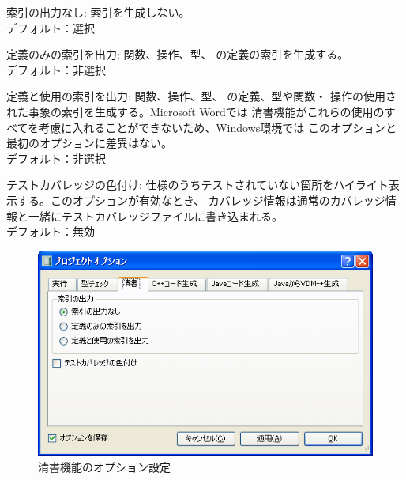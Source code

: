 \documentclass[\pformat,12pt]{jarticle}
\newcommand{\guicmd}[1]{{\gt #1}}
\begin{document}
\begin{list}{}{}


\item[{\guicmd{索引の出力なし}}:]
  索引を生成しない。\\
  デフォルト：選択

\item[{\guicmd{定義のみの索引を出力}}:]
  関数、操作、型、
    の定義の索引を生成する。\\
  デフォルト：非選択

\item[{\guicmd{定義と使用の索引を出力}}:]
  関数、操作、型、
   の定義、型や関数・
  操作の使用された事象の索引を生成する。Microsoft Wordでは
  清書機能がこれらの使用のすべてを考慮に入れることができないため、Windows環境では
  このオプションと最初のオプションに差異はない。\\
  デフォルト：非選択

\item[{\guicmd{テストカバレッジの色付け}}:]
  仕様のうちテストされていない箇所をハイライト表示する。このオプションが有効なとき、
  カバレッジ情報は通常のカバレッジ情報と一緒にテストカバレッジファイルに書き込まれる。\\
  デフォルト：無効

\end{list}



\begin{figure}[tbh]
\begin{center}
\includegraphics[width=12cm]{ppOptions-pp.png}
\caption{清書機能のオプション設定}
\label{fig:optpp}
\end{center}
\end{figure}
\end{document}
